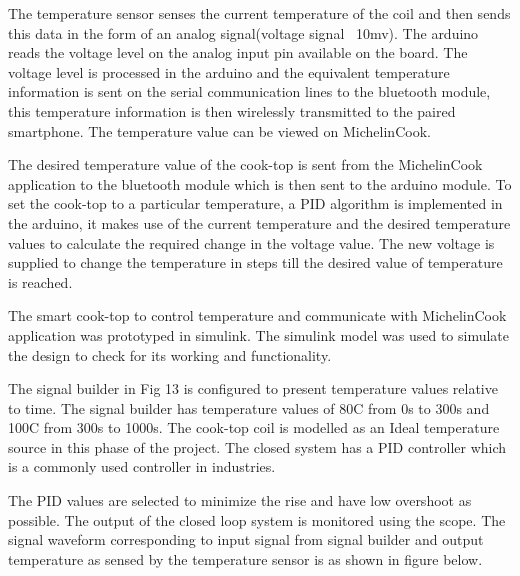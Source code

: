 The temperature sensor senses the current temperature of the coil and then sends this data in the form of an analog signal(voltage signal ~10mv). The arduino reads the voltage level on the analog input pin available on the board. The voltage level is processed in the arduino and the equivalent temperature information is sent on the serial communication lines to the bluetooth module, this temperature information is then wirelessly transmitted to the paired smartphone. The temperature value can be viewed on MichelinCook.

The desired temperature value of the cook-top is sent from the MichelinCook application to the bluetooth module which is then sent to the arduino module. To set the cook-top to a particular temperature, a PID algorithm is implemented in the arduino, it makes use of the current temperature and the desired temperature values to calculate the required change in the voltage value. The new voltage is supplied to change the temperature in steps till the desired value of temperature is reached. 

The smart cook-top to control temperature and communicate with MichelinCook application was prototyped in simulink. The simulink model was used to simulate the design to check for its working and functionality.


The signal builder in Fig 13 is configured to present temperature values relative to time. The signal builder has temperature values of 80C from 0s to 300s and 100C from 300s to 1000s. The cook-top coil is modelled as an Ideal temperature source in this phase of the project. The closed system has a PID controller which is a commonly used controller in industries.

The PID values are selected to minimize the rise and have low overshoot as possible. The output of the closed loop system is monitored using the scope. The signal waveform corresponding to input signal from signal builder and output temperature as sensed by the temperature sensor is as shown in figure below.


